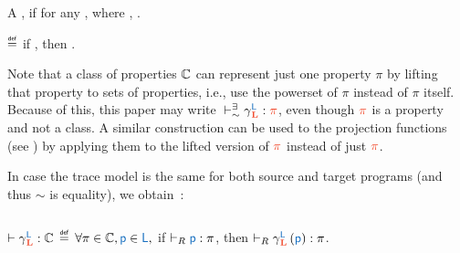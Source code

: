 % 
A , if for any , where , .

\begin{definition}\label{def:rtp:sigma}
  $\isdef$
   if \iul{$\rsat{\src{\progvar}}{\sigma_\sim\left(\trg{\pi}\right)}$}, then .
\end{definition}
Note that a class of properties $\mathbb{C}$ can represent just one property $\pi$ by lifting~\cite{clarkson2008hyper} that property to sets of properties, i.e., use the powerset of $\pi$ instead of $\pi$ itself.
Because of this, this paper may write $\rtptau{\cc{\src{L}}{\trg{L}}}{\trg{\pi}}{\sim}$, even though $\trg{\pi}$ is a property and not a class.
A similar construction can be used to the projection functions (see ) by applying them to the lifted version of $\trg{\pi}$ instead of just $\trg{\pi}$.


In case the trace model is the same for both source and target programs (and thus $\sim$ is equality), we obtain~\cite{abate2019jour}:
\begin{definition}\label{def:rtp}
  $\;$ 


  {$\rtp{\cc{\src{L}}{\trg{L}}}{\class}$}
  $\isdef$
  {$\forall \pi\in\class, \src{p}\in\src{L},$} if {$\rsat{\src{\progvar}}{\pi}$}, then {$\rsat{\cc{\src{L}}{\trg{L}}\left(\src{p}\right)}{\pi}$}.
\end{definition}

